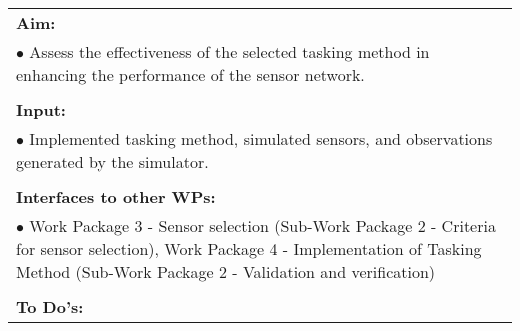 \begin{table}[!h]
\begin{center}
\begin{tabular}{|p{35mm}||p{55mm}|p{50mm}||p{40mm}|}
      \hline\hline
      \multicolumn{4}{|p{150mm}|}{\textbf{Aim:}}                                                                                                                                                            \\
      \multicolumn{4}{|p{150mm}|}{$\bullet$ Assess the effectiveness of the selected tasking method in enhancing the performance of the sensor network.}                                                   \\
      \multicolumn{4}{|p{150mm}|}{}                                                                                                                                                                           \\
      \multicolumn{4}{|p{150mm}|}{\textbf{Input:}}                                                                                                                                                            \\
      \multicolumn{4}{|p{150mm}|}{$\bullet$ Implemented tasking method, simulated sensors, and observations generated by the simulator.}                                                                                                                                 \\
      \multicolumn{4}{|p{150mm}|}{}                                                                                                                                                                           \\
      \multicolumn{4}{|p{150mm}|}{\textbf{Interfaces to other WPs:}}                                                                                                                                    \\
      \multicolumn{4}{|p{150mm}|}{$\bullet$ Work Package 3 - Sensor selection (Sub-Work Package 2 - Criteria for sensor selection), Work Package 4 - Implementation of Tasking Method (Sub-Work Package 2 - Validation and verification)}                                                                                              \\
      \multicolumn{4}{|p{150mm}|}{}                                                                                                                                                                           \\
      \multicolumn{4}{|p{150mm}|}{\textbf{To Do's:}}                                                                                                                                                         \\

\end{tabular}
\end{center}
\end{table}
